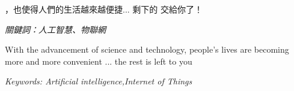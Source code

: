 \renewcommand{\abstractname}{摘要}
\begin{cntabstract}
，也使得人們的生活越來越便捷... 剩下的 交給你了！

\hbox{}
\it{關鍵詞：人工智慧、物聯網}
\end{cntabstract}

\addchaptertocentry{\abstractname}

\author{Shio-Min Wang}
\subject{Department of Electronic Engineering}

\renewcommand{\abstractname}{Abstract}
\begin{engabstract}

With the advancement of science and technology, people's lives are becoming more and more convenient ... the rest is left to you

\hbox{}
\it{Keywords: Artificial intelligence,Internet of Things}
\end{engabstract}